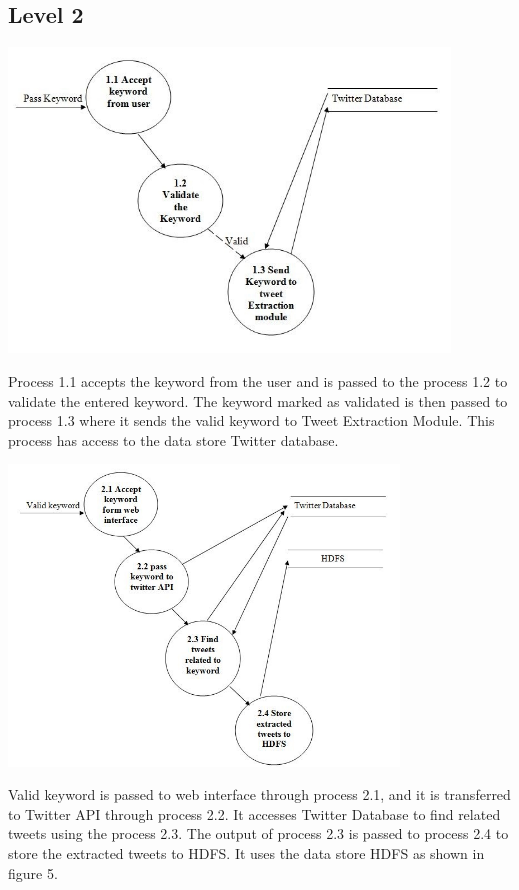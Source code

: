 \documentclass[a4paper,12pt]{report}
\begin{document}
\subsection{Level 2}
\begin{center}
	\includegraphics[height=8.1cm]{images/level21.jpg}
\end{center}
\hspace*{\parindent}Process 1.1 accepts the keyword from the user and is passed to the process 1.2 to validate the entered keyword. The keyword marked as validated is then passed to process 1.3 where it sends the valid keyword to Tweet Extraction Module. This process has access to the data store Twitter database.
\begin{center}
	\includegraphics[height=8cm]{images/level22.jpg}
\end{center}
\hspace*{\parindent}Valid keyword is passed to web interface through process 2.1, and it is transferred to Twitter API through process 2.2. It accesses Twitter Database to find related tweets using the process 2.3. The output of process 2.3 is passed to process 2.4 to store the extracted tweets to HDFS. It uses the data store HDFS as shown in figure 5.
\end{document}
